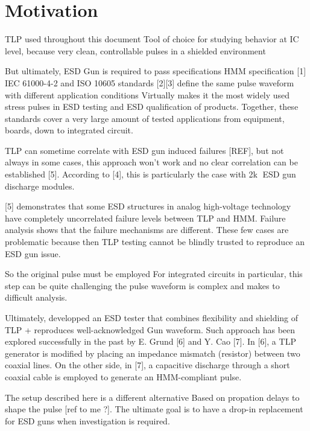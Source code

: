 \section{Motivation}

TLP used throughout this document
Tool of choice for studying behavior at IC level, because very clean, controllable pulses in a shielded environment

But ultimately, ESD Gun is required to pass specifications
HMM specification [1] IEC 61000-4-2 and ISO 10605 standards [2][3] define the same pulse waveform with different application conditions
Virtually makes it the most widely used stress pulses in ESD testing and ESD qualification of products.
Together, these standards cover a very large amount of tested applications from equipment, boards, down to integrated circuit.

TLP can sometime correlate with ESD gun induced failures [REF], but not always
in some cases, this approach won’t work and no clear correlation can be established [5].
According to [4], this is particularly the case with 2k ESD gun discharge modules.

[5] demonstrates that some ESD structures in analog high-voltage technology have completely uncorrelated failure levels between TLP and HMM. Failure analysis shows that the failure mechanisms are different.
These few cases are problematic because then TLP testing cannot be blindly trusted to reproduce an ESD gun issue.

So the original pulse must be employed
For integrated circuits in particular, this step can be quite challenging
the pulse waveform is complex and makes to difficult analysis.


Ultimately, developped an ESD tester that combines flexibility and shielding of TLP + reproduces well-acknowledged Gun waveform.
Such approach has been explored successfully in the past by E. Grund [6] and Y. Cao [7].
In [6], a TLP generator is modified by placing an impedance mismatch (resistor) between two coaxial lines.
On the other side, in [7], a capacitive discharge through a short coaxial cable is employed to generate an HMM-compliant pulse.

The setup described here is a different alternative
Based on propation delays to shape the pulse [ref to me ?].
The ultimate goal is to have a drop-in replacement for ESD guns when investigation is required.

